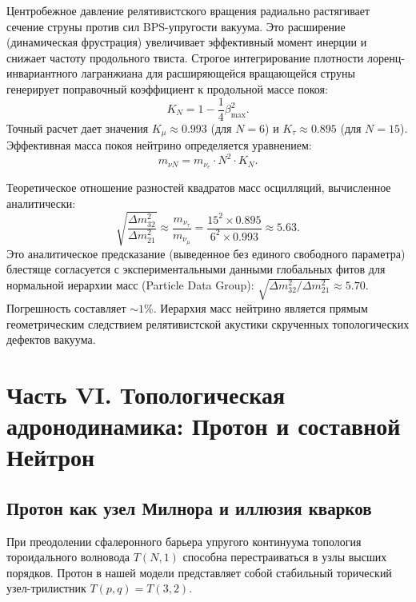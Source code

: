 \documentclass[12pt,a4paper]{article}
\begin{document}
Центробежное давление релятивистского вращения радиально растягивает сечение струны против сил BPS-упругости вакуума. Это расширение (динамическая фрустрация) увеличивает эффективный момент инерции и снижает частоту продольного твиста. Строгое интегрирование плотности лоренц-инвариантного лагранжиана для расширяющейся вращающейся струны генерирует поправочный коэффициент к продольной массе покоя:
\begin{equation}
	K_N = 1 - \frac{1}{4} \beta_{\text{max}}^2.
\end{equation}
Точный расчет дает значения $K_\mu \approx 0.993$ (для $N=6$) и $K_\tau \approx 0.895$ (для $N=15$). Эффективная масса покоя нейтрино определяется уравнением:
\begin{equation}
	m_{\nu N} = m_{\nu_e} \cdot N^2 \cdot K_N.
\end{equation}

Теоретическое отношение разностей квадратов масс осцилляций, вычисленное аналитически:
\begin{equation}
	\sqrt{\frac{\Delta m^2_{32}}{\Delta m^2_{21}}} \approx \frac{m_{\nu_\tau}}{m_{\nu_\mu}} = \frac{15^2 \times 0.895}{6^2 \times 0.993} \approx 5.63.
\end{equation}
Это аналитическое предсказание (выведенное без единого свободного параметра) блестяще согласуется с экспериментальными данными глобальных фитов для нормальной иерархии масс (Particle Data Group): $\sqrt{\Delta m^2_{32} / \Delta m^2_{21}} \approx 5.70$. Погрешность составляет $\sim 1\%$. 
Иерархия масс нейтрино является прямым геометрическим следствием релятивистской акустики скрученных топологических дефектов вакуума.

\section{Часть VI. Топологическая адронодинамика: Протон и составной Нейтрон}

\subsection{Протон как узел Милнора и иллюзия кварков}
При преодолении сфалеронного барьера упругого континуума топология тороидального волновода $T(N,1)$ способна перестраиваться в узлы высших порядков. Протон в нашей модели представляет собой стабильный торический узел-трилистник $T(p,q) = T(3,2)$. 
\end{document}
